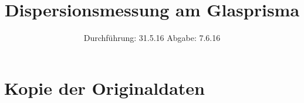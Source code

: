 

\subject{V 402}
\title{Dispersionsmessung am Glasprisma}
\date{
  Durchführung: 31.5.16
  \hspace{3em}
  Abgabe: 7.6.16
}



\maketitle
\thispagestyle{empty}
\tableofcontents
\newpage






\printbibliography

\appendix
\section{Kopie der Originaldaten}


